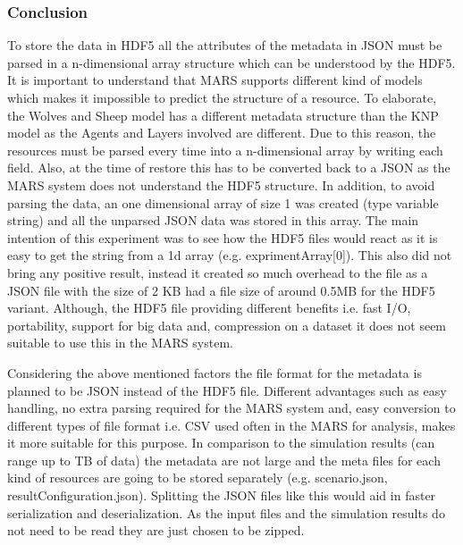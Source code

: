 \subsubsection{Conclusion}
    To store the data in HDF5 all the attributes of the metadata in JSON must be parsed in a n-dimensional array structure which can be understood by the HDF5. 
    It is important to understand that MARS supports different kind of models which makes it impossible to predict the structure of a resource. To elaborate, the
    Wolves and Sheep \cite{HAWHamburgMARS} model has a different metadata structure than the KNP \cite{HAWHamburgMARS} model as the Agents and Layers involved are 
    different. Due to this reason, the resources
    must be parsed every time into a n-dimensional array by writing each field. Also, at the time of restore this has to be converted back 
    to a JSON as the MARS system does not understand the HDF5 structure. In addition, to avoid parsing the data, 
    an one dimensional array of size 1 was created (type variable string) and all the unparsed JSON data
    was stored in this array. The main intention of this experiment was to see how the HDF5 files would react as it is easy to get the string from a 1d array 
    (e.g. exprimentArray[0]). This also did not bring any positive result, instead it created so much overhead to the file as a JSON file with the size of 2 KB
    had a file size of around 0.5MB for the HDF5 variant. Although, the HDF5 file providing different benefits i.e. fast I/O, portability, support for big data and,
    compression on a dataset it does not seem suitable to use this in the MARS system.
    
    Considering the above mentioned factors the file format for the metadata is planned to be JSON instead of the HDF5 file. Different advantages such as easy 
    handling, no extra parsing
    required for the MARS system and, easy conversion to different types of file format i.e. CSV used often in the MARS for analysis, makes it more suitable for this purpose. 
    In comparison to the simulation results (can range up to TB of data) the metadata are not large and the meta files for each kind of resources
    are going to be stored separately (e.g. scenario.json, resultConfiguration.json). Splitting the JSON files like this would aid in faster serialization and 
    deserialization. As the input files and the simulation results do not need to be read they are just chosen to be zipped.

